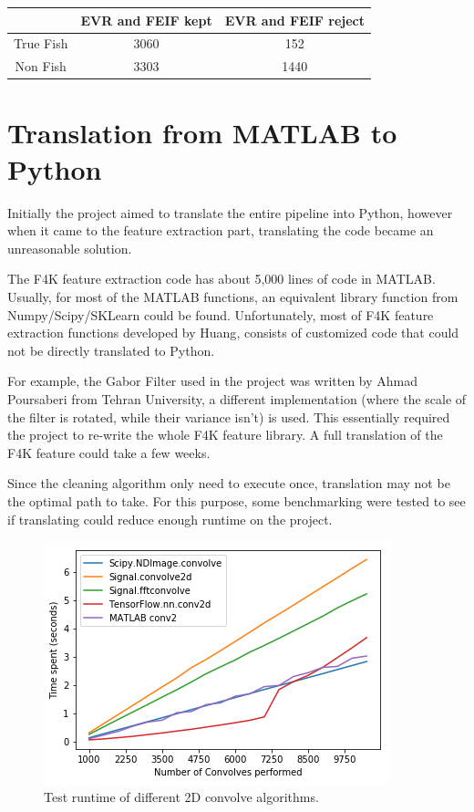 \documentclass[bsc,logo,twoside,fullspacing,parskip]{infthesis}
\begin{document}
\begin{center}
\begin{tabular}{|C|C|C|}
\hline 
$ $ & EVR and FEIF kept & EVR and FEIF reject \\
\hline 
True Fish & 3060 & 152 \\
Non Fish & 3303 & 1440 \\
\hline 
\end{tabular}
\end{center}

\section{Translation from MATLAB to Python}
\label{sec:translate}

Initially the project aimed to translate the entire pipeline into Python, however when it came to the feature extraction part, translating the code became an unreasonable solution.

The F4K feature extraction code has about 5,000 lines of code in MATLAB.
Usually, for most of the MATLAB functions, an equivalent library function from Numpy/Scipy/SKLearn could be found.
Unfortunately, most of F4K feature extraction functions developed by Huang\cite{Huang}, consists of customized code that could not be directly translated to Python.

For example, the Gabor Filter used in the project was written by Ahmad Poursaberi from Tehran University, a different implementation (where the scale of the filter is rotated, while their variance isn't) is used. 
This essentially required the project to re-write the whole F4K feature library.
A full translation of the F4K feature could take a few weeks. 

Since the cleaning algorithm only need to execute once, translation may not be the optimal path to take. 
For this purpose, some benchmarking were tested to see if translating could reduce enough runtime on the project.

\begin{figure}[h]
    \centering
    \includegraphics[scale=0.5]{graph/benchmark.png}
    \caption{Test runtime of different 2D convolve algorithms.}
    \label{fig:benchmark}
\end{figure}
\end{document}

